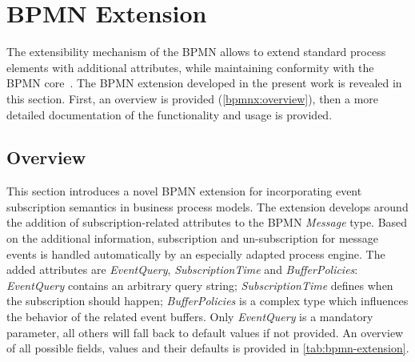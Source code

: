 \section{BPMN Extension}\label{ch:bpmnx}


The extensibility mechanism of the \ac{BPMN} allows to extend standard process elements with additional attributes, while maintaining conformity with the BPMN core~\cite[p.\,44]{bpmnspec}.
The BPMN extension developed in the present work is revealed in this section. First, an overview is provided (\autoref{bpmnx:overview}), then a more detailed documentation of the functionality and usage is provided.

\subsection{Overview}\label{bpmnx:overview}
This section introduces a novel BPMN extension for incorporating event subscription semantics in business process models.
The extension develops around the addition of subscription-related attributes to the BPMN \textit{Message} type. Based on the additional information, subscription and un-subscription for message events is handled automatically by an especially adapted process engine.
The added attributes are \textit{EventQuery}, \textit{SubscriptionTime} and \textit{BufferPolicies}:
\textit{EventQuery} contains an arbitrary query string; \textit{SubscriptionTime} defines when the subscription should happen; \textit{BufferPolicies} is a complex type which influences the behavior of the related event buffers.
Only \textit{EventQuery} is a mandatory parameter, all others will fall back to default values if not provided.
An overview of all possible fields, values and their defaults is provided in \autoref{tab:bpmn-extension}.


